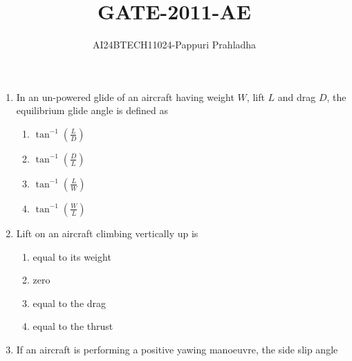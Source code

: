 \documentclass[journal]{IEEEtran}
\begin{document}

\vspace{3cm}

\title{GATE-2011-AE}
\author{AI24BTECH11024-Pappuri Prahladha}
{\let\newpage\relax\maketitle}

\renewcommand{\thefigure}{\theenumi}
\renewcommand{\thetable}{\theenumi}
\setlength{\intextsep}{10pt} %


\renewcommand{\thetable}{\theenumi}
\begin{enumerate}[start=14]
 \item  In an un-powered glide of an aircraft having weight $W $, lift $ L $ and drag $ D $, the equilibrium glide angle is defined as
 \begin{multicols}{1}
    
    \begin{enumerate}
        \item  $\tan^{-1} \left( \frac{L}{D} \right)$ 
        \item  $\tan^{-1} \left( \frac{D}{L} \right)$ 
        \item  $\tan^{-1} \left( \frac{L}{W} \right) $
        \item  $\tan^{-1} \left( \frac{W}{L} \right) $
    \end{enumerate}
\end{multicols}  
\item  Lift on an aircraft climbing vertically up is
 \begin{multicols}{2}
    \begin{enumerate}
        \item equal to its weight
        \item zero
        \item equal to the drag
        \item equal to the thrust
    \end{enumerate}
\end{multicols}   
 \item If an aircraft is performing a positive yawing manoeuvre, the side slip angle
 \begin{multicols}{1}


\end{multicols}
\end{enumerate}
\end{document}
